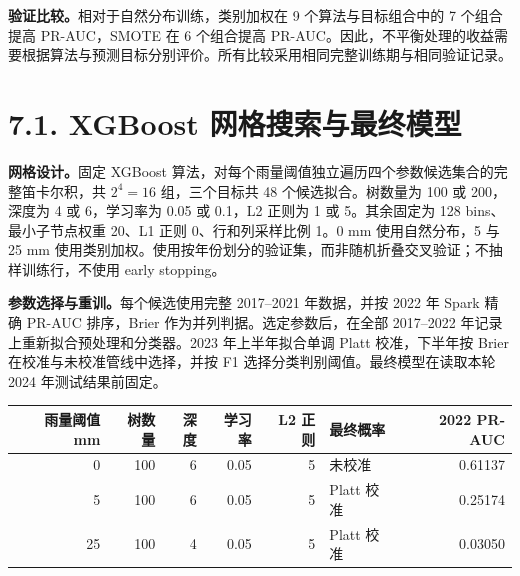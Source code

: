 \documentclass[UTF8,fontset=fandol,10pt,a4paper,landscape]{ctexart}
\begin{document}
\textbf{验证比较。}相对于自然分布训练，类别加权在 9 个算法与目标组合中的 7 个组合提高 PR-AUC，SMOTE 在 6 个组合提高 PR-AUC。因此，不平衡处理的收益需要根据算法与预测目标分别评价。所有比较采用相同完整训练期与相同验证记录。

\clearpage\section*{7.1. XGBoost 网格搜索与最终模型}

\textbf{网格设计。}固定 XGBoost 算法，对每个雨量阈值独立遍历四个参数候选集合的完整笛卡尔积，共 $2^4=16$ 组，三个目标共 48 个候选拟合。树数量为 100 或 200，深度为 4 或 6，学习率为 0.05 或 0.1，L2 正则为 1 或 5。其余固定为 128 bins、最小子节点权重 20、L1 正则 0、行和列采样比例 1。0 mm 使用自然分布，5 与 25 mm 使用类别加权。使用按年份划分的验证集，而非随机折叠交叉验证；不抽样训练行，不使用 early stopping。

\textbf{参数选择与重训。}每个候选使用完整 2017--2021 年数据，并按 2022 年 Spark 精确 PR-AUC 排序，Brier 作为并列判据。选定参数后，在全部 2017--2022 年记录上重新拟合预处理和分类器。2023 年上半年拟合单调 Platt 校准，下半年按 Brier 在校准与未校准管线中选择，并按 F1 选择分类判别阈值。最终模型在读取本轮 2024 年测试结果前固定。
\begin{center}\begin{tabular}{rrrrrlr}\toprule
雨量阈值 mm & 树数量 & 深度 & 学习率 & L2 正则 & 最终概率 & 2022 PR-AUC\\\midrule
0 & 100 & 6 & 0.05 & 5 & 未校准 & 0.61137\\
5 & 100 & 6 & 0.05 & 5 & Platt 校准 & 0.25174\\
25 & 100 & 4 & 0.05 & 5 & Platt 校准 & 0.03050\\
\bottomrule\end{tabular}\end{center}
\end{document}
